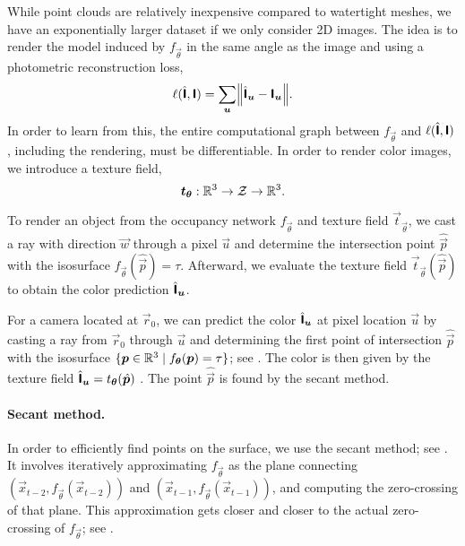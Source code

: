 While point clouds are relatively inexpensive compared to watertight meshes, we have an
exponentially larger dataset if we only consider 2D images. The idea is to render the model induced
by $f_{\vec{\theta}}$ in the same angle as the image and using a photometric reconstruction loss, \[
    \ell(\hat{\tens{I}}, \tens{I}) = \sum_{\vec{u}} \lft\| \hat{\tens{I}}_{\vec{u}} - \tens{I}_{\vec{u}} \rgt\|.
\]
In order to learn from this, the entire computational graph between $f_{\vec{\theta}}$ and
$\ell(\hat{\bm{\mathsf{I}}},\bm{\mathsf{I}})$, including the rendering, must be differentiable. In order to
render color images, we introduce a texture field, \[
    \bm{t}_{\bm{\theta}}: \mathbb{R}^3 \to \mathcal{Z} \to \mathbb{R}^3.
\]

\begin{marginfigure}
    \centering
    \caption{To render an object from the occupancy network $f_{\vec{\theta}}$ and texture field $\vec{t}_{\vec{\theta}}$, we cast a ray with direction $\vec{w}$ through a pixel $\vec{u}$ and determine the intersection point $\hat{\vec{p}}$ with the isosurface $f_{\vec{\theta}}(\hat{\vec{p}}) = \tau$. Afterward, we evaluate the texture field $\vec{t}_{\vec{\theta}}(\hat{\vec{p}})$ to obtain the color prediction $\hat{\bm{\mathsf{I}}}_{\bm{u}}$.}
    \label{fig:differentiable-rendering}
\end{marginfigure}

For a camera located at $\vec{r}_0$, we can predict the color $\hat{\bm{\mathsf{I}}}_{\bm{u}}$ at pixel
location $\vec{u}$ by casting a ray from $\vec{r}_0$ through $\vec{u}$ and determining the first
point of intersection $\hat{\vec{p}}$ with the isosurface $\{ \bm{p} \in \mathbb{R}^3 \mid
    f_{\bm{\theta}}(\bm{p}) = \tau \}$; see . The color is then
given by the texture field $\hat{\bm{\mathsf{I}}}_{\bm{u}} = t_{\bm{\theta}}(\hat{\bm{p}})$
\citep{niemeyer2020differentiable}. The point $\hat{\vec{p}}$ is found by the secant method.

\paragraph{Secant method.}

In order to efficiently find points on the surface, we use the secant method; see
. It involves iteratively approximating $f_{\vec{\theta}}$ as the plane connecting
$(\vec{x}_{t-2}, f_{\vec{\theta}}(\vec{x}_{t-2}))$ and $(\vec{x}_{t-1},
    f_{\vec{\theta}}(\vec{x}_{t-1}))$, and computing the zero-crossing of that plane. This
approximation gets closer and closer to the actual zero-crossing of $f_{\vec{\theta}}$; see
.

